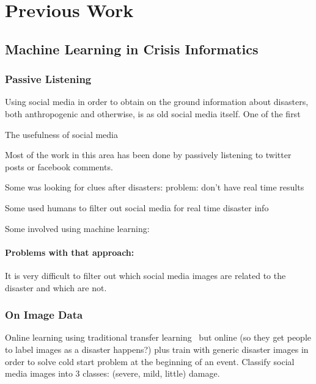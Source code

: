 \chapter{Previous Work}

\section{Machine Learning in Crisis Informatics}

\subsection{Passive Listening}
Using social media in order to obtain on the ground information about
disasters, both anthropogenic and otherwise, is as old social media itself. One
of the first

The usefulness of social media

Most of the work in this area has been done by passively listening to twitter
posts or facebook comments.

Some was looking for clues after disasters:
\cite{viewegMicrobloggingTwoNatural2010}
problem: don't have real time results

Some used humans to filter out social media for real time disaster info
\cite{starbirdVoluntweetersSelforganizingDigital}
\cite{meierDigitalHumanitariansHow2015}

Some involved using machine learning:
\cite{imranPracticalExtractionDisasterrelevant2013}
\subsubsection{Problems with that approach:}
It is very difficult to filter out which social media images are related to the
disaster and which are not.



\subsection{On Image Data}
Online learning using traditional transfer
learning~\cite{donahueDeCAFDeepConvolutional2013} but online (so they get people
to label images as a disaster happens?) plus train with generic disaster
images in order to solve cold start problem at the beginning of an event.
Classify social media images into 3 classes: (severe, mild, little) damage.
\cite{nguyenDamageAssessmentSocial2017}



